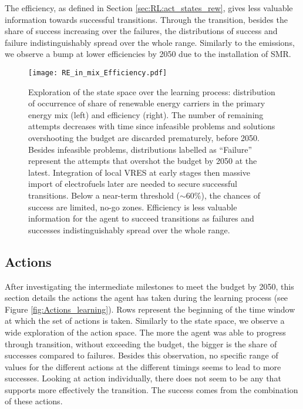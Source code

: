 The efficiency, as defined in Section \ref{sec:RL:act_states_rew}, gives less valuable information towards successful transitions. Through the transition, besides the share of success increasing over the failures, the distributions of success and failure indistinguishably spread over the whole range. Similarly to the emissions, we observe a bump at lower efficiencies by 2050 due to the installation of \gls{SMR}.

\begin{figure}[!htbp]
\centering
\texttt{[image: RE\_in\_mix\_Efficiency.pdf]}
\caption{Exploration of the state space over the learning process: distribution of occurrence of share of renewable energy carriers in the primary energy mix (left) and efficiency (right).  The number of remaining attempts decreases with time since infeasible problems and solutions overshooting the  budget are discarded prematurely, \ie before 2050. Besides infeasible problems, distributions labelled as ``Failure'' represent the attempts that overshot the  budget by 2050 at the latest. Integration of local \gls{VRES} at early stages then massive import of electrofuels later are needed to secure successful transitions. Below a near-term threshold ($\sim$60\%), the chances of success are limited, \ie no-go zones. Efficiency is less valuable information for the agent to succeed transitions as failures and successes indistinguishably spread over the whole range.}
\label{fig:RE_in_mix_Efficiency}
\end{figure}

\subsection{Actions}
\label{subsec:RL:learning:actions}

After investigating the intermediate milestones to meet the  budget by 2050, this section details the actions the agent has taken during the learning process (see Figure \ref{fig:Actions_learning}). Rows represent the beginning of the time window at which the set of actions is taken. Similarly to the state space, we observe a wide exploration of the action space. The more the agent was able to progress through transition, without exceeding the  budget, the bigger is the share of successes compared to failures. Besides this observation, no specific range of values for the different actions at the different timings seems to lead to more successes. Looking at action individually, there does not seem to be any that supports more effectively the transition. The success comes from the combination of these actions.


